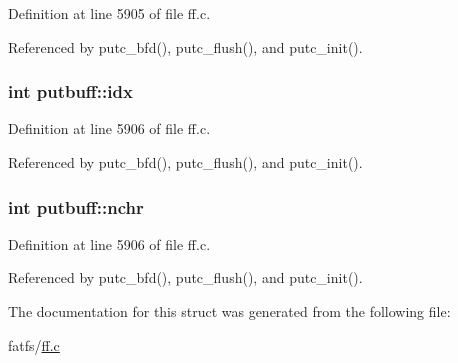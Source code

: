Definition at line 5905 of file ff.\+c.



Referenced by putc\+\_\+bfd(), putc\+\_\+flush(), and putc\+\_\+init().

\subsubsection[{\texorpdfstring{idx}{idx}}]{\setlength{\rightskip}{0pt plus 5cm}int putbuff\+::idx}\hypertarget{structputbuff_a10a3ca93af8df07e9836ebd5230c06d8}{}\label{structputbuff_a10a3ca93af8df07e9836ebd5230c06d8}


Definition at line 5906 of file ff.\+c.



Referenced by putc\+\_\+bfd(), putc\+\_\+flush(), and putc\+\_\+init().

\subsubsection[{\texorpdfstring{nchr}{nchr}}]{\setlength{\rightskip}{0pt plus 5cm}int putbuff\+::nchr}\hypertarget{structputbuff_a125366bfe48077e6f562f95e30b4604a}{}\label{structputbuff_a125366bfe48077e6f562f95e30b4604a}


Definition at line 5906 of file ff.\+c.



Referenced by putc\+\_\+bfd(), putc\+\_\+flush(), and putc\+\_\+init().



The documentation for this struct was generated from the following file\+:\begin{DoxyCompactItemize}
\item 
fatfs/\hyperlink{ff_8c}{ff.\+c}\end{DoxyCompactItemize}
